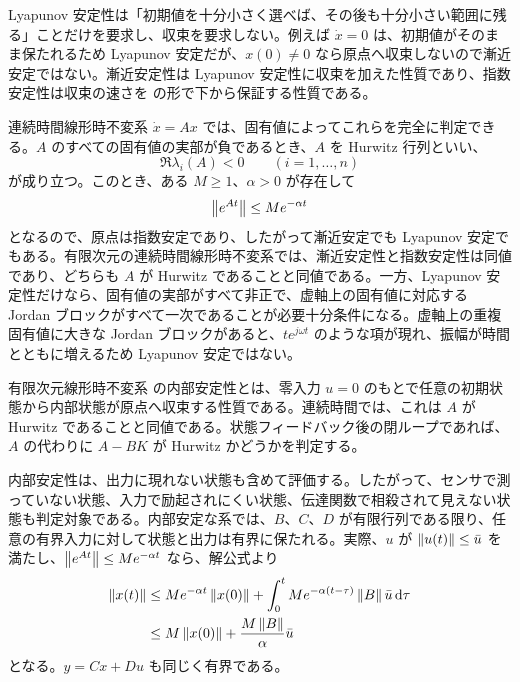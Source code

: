Lyapunov 安定性は「初期値を十分小さく選べば、その後も十分小さい範囲に残る」ことだけを要求し、収束を要求しない。例えば $\dot{x}=0$ は、初期値がそのまま保たれるため Lyapunov 安定だが、$x(0)\ne0$ なら原点へ収束しないので漸近安定ではない。漸近安定性は Lyapunov 安定性に収束を加えた性質であり、指数安定性は収束の速さを  の形で下から保証する性質である。

連続時間線形時不変系 $\dot{x}=Ax$ では、固有値によってこれらを完全に判定できる。$A$ のすべての固有値の実部が負であるとき、$A$ を Hurwitz 行列といい、
\begin{equation}
  \Re\lambda_i(A)<0\qquad(i=1,\ldots,n)
\end{equation}
が成り立つ。このとき、ある $M\ge1$、$\alpha>0$ が存在して
\begin{equation}
  \left\|e^{At}\right\|\le M e^{-\alpha t}
\end{equation}
となるので、原点は指数安定であり、したがって漸近安定でも Lyapunov 安定でもある。有限次元の連続時間線形時不変系では、漸近安定性と指数安定性は同値であり、どちらも $A$ が Hurwitz であることと同値である。一方、Lyapunov 安定性だけなら、固有値の実部がすべて非正で、虚軸上の固有値に対応する Jordan ブロックがすべて一次であることが必要十分条件になる。虚軸上の重複固有値に大きな Jordan ブロックがあると、$te^{j\omega t}$ のような項が現れ、振幅が時間とともに増えるため Lyapunov 安定ではない。

\begin{definition}[内部安定性]
有限次元線形時不変系  の内部安定性とは、零入力 $u=0$ のもとで任意の初期状態から内部状態が原点へ収束する性質である。連続時間では、これは $A$ が Hurwitz であることと同値である。状態フィードバック後の閉ループであれば、$A$ の代わりに $A-BK$ が Hurwitz かどうかを判定する。
\end{definition}

内部安定性は、出力に現れない状態も含めて評価する。したがって、センサで測っていない状態、入力で励起されにくい状態、伝達関数で相殺されて見えない状態も判定対象である。内部安定な系では、$B$、$C$、$D$ が有限行列である限り、任意の有界入力に対して状態と出力は有界に保たれる。実際、$u$ が $\left\|u(t)\right\|\le \bar{u}$ を満たし、$\left\|e^{At}\right\|\le M e^{-\alpha t}$ なら、解公式より
\begin{align}
  \left\|x(t)\right\|
  &\le M e^{-\alpha t}\left\|x(0)\right\|
     +\int_0^t M e^{-\alpha(t-\tau)}\left\|B\right\|\bar{u}\,\mathrm{d}\tau\\
  &\le M\left\|x(0)\right\|+\frac{M\left\|B\right\|}{\alpha}\bar{u}
  \label{eq:bounded-state-from-hurwitz}
\end{align}
となる。$y=Cx+Du$ も同じく有界である。


